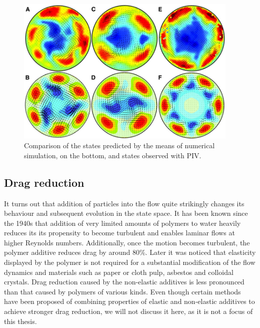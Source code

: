 \documentclass[11pt,a4paper]{article}
\begin{document}
\begin{figure}[h]
    \centering
    \includegraphics[width=0.95\textwidth]{experiment_vs_simulation.png}
    \caption{Comparison of the states predicted by the means of numerical simulation, on the bottom, and states observed with PIV\cite{Hof04etal}.}\label{img:ex_simu}
\end{figure}

\subsection{Drag reduction}

It turns out that addition of particles into the flow quite strikingly changes its behaviour and subsequent evolution in the state space.
It has been known since the 1940s\cite{Toms49}\cite{Mysels72} that addition of very limited amounts of polymers to water heavily reduces its its propensity to become turbulent and enables laminar flows at higher Reynolds numbers.
Additionally, once the motion becomes turbulent, the polymer additive reduces drag by around 80\%\cite{Sreenivasan00}.
Later it was noticed that elasticity displayed by the polymer is not required for a substantial modification of the flow dynamics\cite{Pashkewitz04} and materials such as paper or cloth pulp\cite{Radin75}\cite{Robertson57}, asbestos\cite{Mccomb85} and colloidal crystals\cite{Pirith72}\cite{Radin75}.
Drag reduction caused by the non-elastic additives is less pronounced than that caused by polymers of various kinds.
Even though certain methods have been proposed\cite{Pashkewitz04}\cite{Lee74} of combining properties of elastic and non-elastic additives to achieve stronger drag reduction, we will not discuss it here, as it is not a focus of this thesis.
\end{document}

